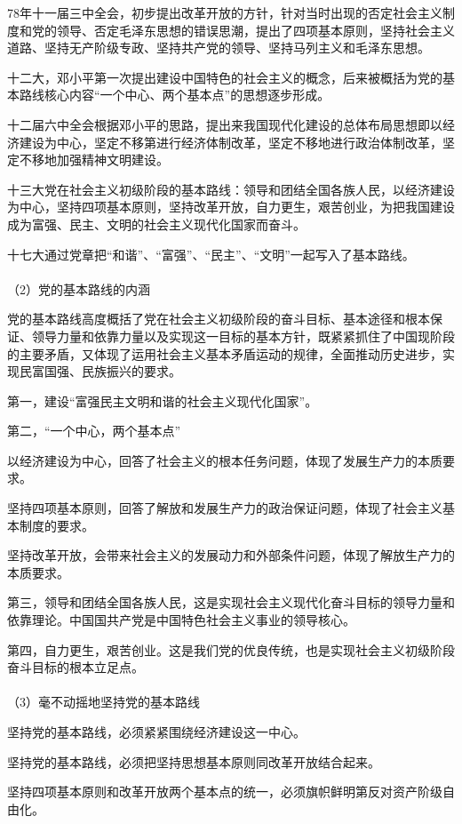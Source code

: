 \documentclass{ctexart}
\begin{document}
78年十一届三中全会，初步提出改革开放的方针，针对当时出现的否定社会主义制度和党的领导、否定毛泽东思想的错误思潮，提出了四项基本原则，坚持社会主义道路、坚持无产阶级专政、坚持共产党的领导、坚持马列主义和毛泽东思想。

十二大，邓小平第一次提出建设中国特色的社会主义的概念，后来被概括为党的基本路线核心内容“一个中心、两个基本点”的思想逐步形成。

十二届六中全会根据邓小平的思路，提出来我国现代化建设的总体布局思想即以经济建设为中心，坚定不移第进行经济体制改革，坚定不移地进行政治体制改革，坚定不移地加强精神文明建设。

十三大党在社会主义初级阶段的基本路线：领导和团结全国各族人民，以经济建设为中心，坚持四项基本原则，坚持改革开放，自力更生，艰苦创业，为把我国建设成为富强、民主、文明的社会主义现代化国家而奋斗。

十七大通过党章把“和谐”、“富强”、“民主”、“文明”一起写入了基本路线。
\\\\

（2）党的基本路线的内涵

党的基本路线高度概括了党在社会主义初级阶段的奋斗目标、基本途径和根本保证、领导力量和依靠力量以及实现这一目标的基本方针，既紧紧抓住了中国现阶段的主要矛盾，又体现了运用社会主义基本矛盾运动的规律，全面推动历史进步，实现民富国强、民族振兴的要求。

第一，建设“富强民主文明和谐的社会主义现代化国家”。

第二，“一个中心，两个基本点”

以经济建设为中心，回答了社会主义的根本任务问题，体现了发展生产力的本质要求。

坚持四项基本原则，回答了解放和发展生产力的政治保证问题，体现了社会主义基本制度的要求。

坚持改革开放，会带来社会主义的发展动力和外部条件问题，体现了解放生产力的本质要求。

第三，领导和团结全国各族人民，这是实现社会主义现代化奋斗目标的领导力量和依靠理论。中国国共产党是中国特色社会主义事业的领导核心。

第四，自力更生，艰苦创业。这是我们党的优良传统，也是实现社会主义初级阶段奋斗目标的根本立足点。
\\\\

（3）毫不动摇地坚持党的基本路线

坚持党的基本路线，必须紧紧围绕经济建设这一中心。

坚持党的基本路线，必须把坚持思想基本原则同改革开放结合起来。

坚持四项基本原则和改革开放两个基本点的统一，必须旗帜鲜明第反对资产阶级自由化。
\end{document}
